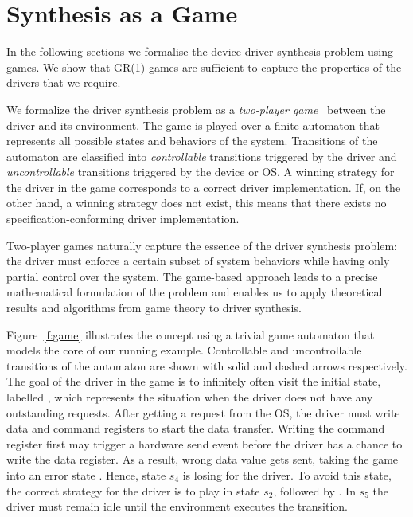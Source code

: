 \chapter{Synthesis as a Game}

In the following sections we formalise the device driver synthesis problem using games. We show that GR(1) games are sufficient to capture the properties of the drivers that we require.

We formalize the driver synthesis problem as a \emph{two-player game}~\cite{Thomas_95} between the driver and its environment. The game is played over a finite automaton that represents all possible states and behaviors of the system. Transitions of the automaton are classified into \emph{controllable} transitions triggered by the driver and \emph{uncontrollable} transitions triggered by the device or OS. A winning strategy for the driver in the game corresponds to a correct driver implementation. If, on the other hand, a winning strategy does not exist, this means that there exists no specification-conforming driver implementation.

Two-player games naturally capture the essence of the driver synthesis problem: the driver must enforce a certain subset of system behaviors while having only partial control over the system. The game-based approach leads to a precise mathematical formulation of the problem and enables us to apply theoretical results and algorithms from game theory to driver synthesis.

Figure~\ref{f:game} illustrates the concept using a trivial game automaton that models the core of our running example. Controllable and uncontrollable transitions of the automaton are shown with solid and dashed arrows respectively.  The goal of the driver in the game is to infinitely often visit the initial state, labelled , which represents the situation when the driver does not have any outstanding requests.  After getting a  request from the OS, the driver must write data and command registers to start the data transfer.  Writing the command register first may trigger a hardware send event before the driver has a chance to write the data register.  As a result, wrong data value gets sent, taking the game into an error state .  Hence, state $s_4$ is losing for the driver.  To avoid this state, the correct strategy for the driver is to play  in state $s_2$, followed by .  In $s_5$ the driver must remain idle until the environment executes the  transition.

